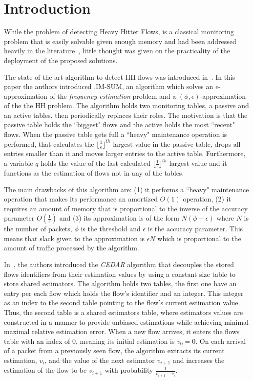 \section{Introduction}
\label{sec:introduction}

While the problem of detecting Heavy Hitter Flows, is a classical monitoring problem that is easily solvable given enough memory and had been addressed heavily in the literature~\cite{fang1999computing,gilbert2001surfing,karp2003simple,Demaine2002,slidingHH,basat2017optimal,zadnik2011evolution}, little thought was given on the practicality of the deployment of the proposed solutions.

The state-of-the-art algorithm to detect HH flows was introduced in~\cite{basat2017optimal}. In this paper the authors introduced ,IM-SUM, an algorithm which solves an $\epsilon$-approximation of the \textit{frequency estimation} problem and a $(\phi, \epsilon)$-approximation of the the HH problem. The algorithm holds two monitoring tables, a passive and an active tables, then periodically replaces their roles. The motivation is that the passive table holds the ``biggest" flows and the active holds the most ``recent" flows. When the passive table gets full a ``heavy" maintenance operation is performed, that calculates the $\lfloor\frac{1}{\epsilon}\rfloor^{th}$ largest value in the passive table, drops all entries smaller than it and moves larger entries to the active table. Furthermore, a variable $q$ holds the value of the last calculated $\lfloor\frac{1}{\epsilon}\rfloor^{th}$ largest value and it functions as the estimation of flows not in any of the tables.

The main drawbacks of this algorithm are: (1) it performs a ``heavy" maintenance operation that makes its performance an amortized $O(1)$ operation, (2) it requires an amount of memory that is proportional to the inverse of the accuracy parameter $O(\frac{1}{\epsilon})$ and (3) its approximation is of the form $N(\phi -\epsilon)$ where $N$ is the number of packets, $\phi$ is the threshold and $\epsilon$ is the accuracy parameter. This means that slack given to the approximation is $\epsilon N$ which is proportional to the amount of traffic processed by the algorithm.

In~\cite{CEDAR}, the authors introduced the \textit{CEDAR} algorithm that decouples the stored flows identifiers from their estimation values by using a constant size table to store shared estimators. The algorithm holds two tables, the first one have an entry per each flow which holds the flow's identifier and an integer. This integer as an index to the second table pointing to the flow's current estimation value. Thus, the second table is a shared estimators table, where estimators values are constructed in a manner to provide unbiased estimations while achieving minimal maximal relative estimation error. When a new flow arrives, it enters the flows table with an index of $0$, meaning its initial estimation is $v_0=0$. On each arrival of a packet from a previously seen flow, the algorithm extracts its current estimation, $v_i$, and the value of the next estimator $v_{i+1}$ and increases the estimation of the flow to be $v_{i+1}$ with probability $\frac{1}{v_{i+1}-v_{i}}$.

